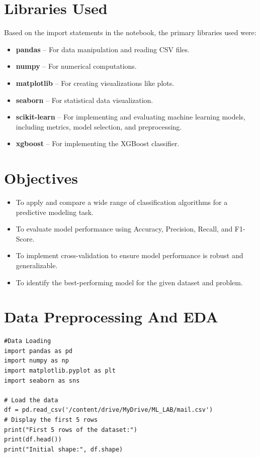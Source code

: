 \documentclass[12pt]{article}
\begin{document}
\section{Libraries Used}
Based on the import statements in the notebook, the primary libraries used were:
\begin{itemize}
    \item \textbf{pandas} – For data manipulation and reading CSV files.
    \item \textbf{numpy} – For numerical computations.
    \item \textbf{matplotlib} – For creating visualizations like plots.
    \item \textbf{seaborn} – For statistical data visualization.
    \item \textbf{scikit-learn} – For implementing and evaluating machine learning models, including metrics, model selection, and preprocessing.
    \item \textbf{xgboost} – For implementing the XGBoost classifier.
\end{itemize}

\section{Objectives}
\begin{itemize}
    \item To apply and compare a wide range of classification algorithms for a predictive modeling task.
    \item To evaluate model performance using Accuracy, Precision, Recall, and F1-Score.
    \item To implement cross-validation to ensure model performance is robust and generalizable.
    \item To identify the best-performing model for the given dataset and problem.
\end{itemize}


\section{Data Preprocessing And EDA }
\begin{verbatim}
#Data Loading
import pandas as pd
import numpy as np
import matplotlib.pyplot as plt
import seaborn as sns

# Load the data
df = pd.read_csv('/content/drive/MyDrive/ML_LAB/mail.csv')
# Display the first 5 rows
print("First 5 rows of the dataset:")
print(df.head())
print("Initial shape:", df.shape)
\end{verbatim}
\end{document}
